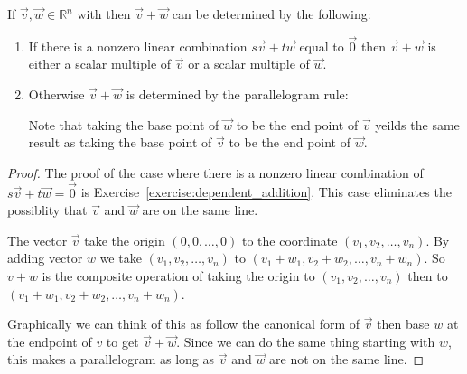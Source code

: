 \begin{proposition} If $\vec{v},\vec{w} \in \mathbb{R}^n$ with then $\vec{v}+\vec{w}$ can be determined by the following:
\begin{enumerate}
\item If there is a nonzero linear combination $s\vec{v}+t\vec{w}$ equal to $\vec{0}$ then 
$\vec{v}+\vec{w}$ is either a scalar multiple of $\vec{v}$ or a scalar multiple of $\vec{w}$.

\item Otherwise $\vec{v}+\vec{w}$ is determined by the parallelogram rule:\\
\begin{center}
\end{center}
Note that taking the base point of $\vec{w}$ to be the end point of $\vec{v}$ yeilds the same result as taking the base point of $\vec{v}$ to be the end point of 
$\vec{w}$.
\end{enumerate}
\end{proposition}
\begin{proof}
The proof of the case where there is a nonzero linear combination of $s\vec{v}+t\vec{w}=\vec{0}$ is Exercise~\ref{exercise:dependent_addition}. This case eliminates the possiblity that $\vec{v}$ and $\vec{w}$ are on the same line.

The vector $\vec{v}$ take the origin $(0,0, \ldots, 0)$ to the coordinate $(v_1, v_2, \ldots, v_n)$. 
By adding vector $w$ we take $(v_1, v_2, \ldots, v_n)$ to $(v_1+w_1, v_2+w_2, \ldots, v_n+w_n)$. 
So $v+w$ is the composite operation of taking the origin to $(v_1, v_2, \ldots, v_n)$ then to $(v_1+w_1, v_2+w_2, \ldots, v_n+w_n)$. 

Graphically we can think of this as follow the canonical form of $\vec{v}$ then base $w$ at the endpoint of $v$ to get $\vec{v}+\vec{w}$. Since we can do the same thing starting with $w$, this makes a parallelogram as long as $\vec{v}$ and $\vec{w}$ are not on the same line.
\end{proof}

